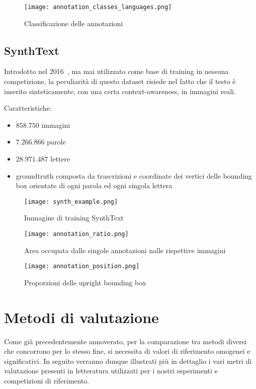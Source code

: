\begin{figure}[H]
	\centering
	\texttt{[image: annotation\_classes\_languages.png]}
	\caption{Classificazione delle annotazioni}
\end{figure}

\subsection{SynthText}
\label{subsec:synth}
Introdotto nel 2016~\cite{synthtext}, ma mai utilizzato come base di training in nessuna competizione, la peculiarità di questo dataset risiede nel fatto che il testo è inserito sinteticamente, con una certa context-awareness, in immagini reali.\par
Caratteristiche:
\begin{itemize}
	\item
		$858.750$ immagini
	\item
		$7.266.866$ parole
	\item
		$28.971.487$ lettere
	\item
		groundtruth composta da trascrizioni e coordinate dei vertici delle bounding box orientate di ogni parola ed ogni singola lettera
\end{itemize}
\vfill
\begin{figure}[H]
	\centering
	\texttt{[image: synth\_example.png]}
	\caption{Immagine di training SynthText}
\end{figure}

\begin{figure}[H]
	\centering
	\texttt{[image: annotation\_ratio.png]}
	\caption{Area occupata dalle singole annotazioni nalle rispettive immagini}\label{fig:annratio}
	\texttt{[image: annotation\_position.png]}
	\caption{Proporzioni delle upright bounding box}\label{fig:annprop}
\end{figure}



\section{Metodi di valutazione}
Come già precedentemente annoverato, per la comparazione tra metodi diversi che concorrono per lo stesso fine, si necessita di valori di riferimento omogenei e significativi.
In seguito verranno dunque illustrati più in dettaglio i vari metri di valutazione presenti in letteratura utilizzati per i nostri esperimenti e competizioni di riferimento.\par

